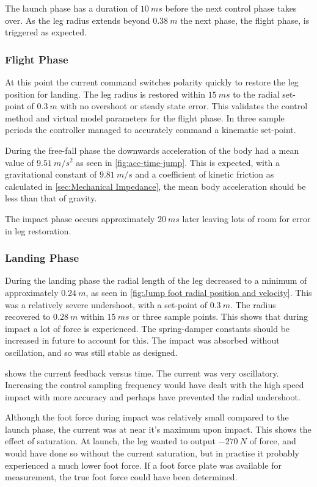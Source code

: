 The launch phase has a duration of $10\ ms$ before the next control phase takes over. As the leg radius extends beyond $0.38\ m$ the next phase, the flight phase, is triggered as expected. 

\subsubsection{Flight Phase}

At this point the current command switches polarity quickly to restore the leg position for landing. The leg radius is restored within $15\ ms$ to the radial set-point of $0.3\ m$ with no overshoot or steady state error. This validates the control method and virtual model parameters for the flight phase. In three sample periods the controller managed to accurately command a kinematic set-point.

During the free-fall phase the downwards acceleration of the body had a mean value of $9.51\ m/s^2$ as seen in \cref{fig:acc-time-jump}. This is expected, with a gravitational constant of $9.81\ m/s$ and a coefficient of kinetic friction as calculated in \cref{sec:Mechanical Impedance}, the mean body acceleration should be less than that of gravity.

The impact phase occurs approximately $20\ ms$ later leaving lots of room for error in leg restoration. 

\subsubsection{Landing Phase}

During the landing phase the radial length of the leg decreased to a minimum of approximately $0.24\ m$, as seen in \cref{fig:Jump foot radial position and velocity}. This was a relatively severe undershoot, with a set-point of $0.3\ m$. The radius recovered to $0.28\ m$ within $15\ ms$ or three sample points. This shows that during impact a lot of force is experienced. The spring-damper constants should be increased in future to account for this. The impact was absorbed without oscillation, and so was still stable as designed.

 shows the current feedback versus time. The current was very oscillatory. Increasing the control sampling frequency would have dealt with the high speed impact with more accuracy and perhaps have prevented the radial undershoot. 

Although the foot force during impact was relatively small compared to the launch phase, the current was at near it's maximum upon impact. This shows the effect of saturation. At launch, the leg wanted to output $-270\ N$ of force, and would have done so without the current saturation, but in practise it probably experienced a much lower foot force. If a foot force plate was available for measurement, the true foot force could have been determined.


